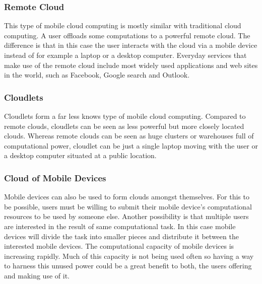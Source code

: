 \documentclass[conference]{IEEEtran}
\begin{document}
\subsubsection{Remote Cloud}
This type of mobile cloud computing is mostly similar with traditional cloud computing. A user offloads some computations to a powerful remote cloud. The difference is that in this case the user interacts with the cloud via a mobile device instead of for example a laptop or a desktop computer. Everyday services that make use of the remote cloud include most widely used applications and web sites in the world, such as Facebook, Google search and Outlook.

\subsubsection{Cloudlets}
Cloudlets form a far less knows type of mobile cloud computing. Compared to remote clouds, cloudlets can be seen as less powerful but more closely located clouds. Whereas remote clouds can be seen as huge clusters or warehouses full of computational power, cloudlet can be just a single laptop moving with the user or a desktop computer situated at a public location.

\subsubsection{Cloud of Mobile Devices}
Mobile devices can also be used to form clouds amongst themselves. For this to be possible, users must be willing to submit their mobile device's computational resources to be used by someone else. Another possibility is that multiple users are interested in the result of same computational task. In this case mobile devices will divide the task into smaller pieces and distribute it between the interested mobile devices. The computational capacity of mobile devices is increasing rapidly. Much of this capacity is not being used often so having a way to harness this unused power could be a great benefit to both, the users offering and making use of it.\\
\end{document}
